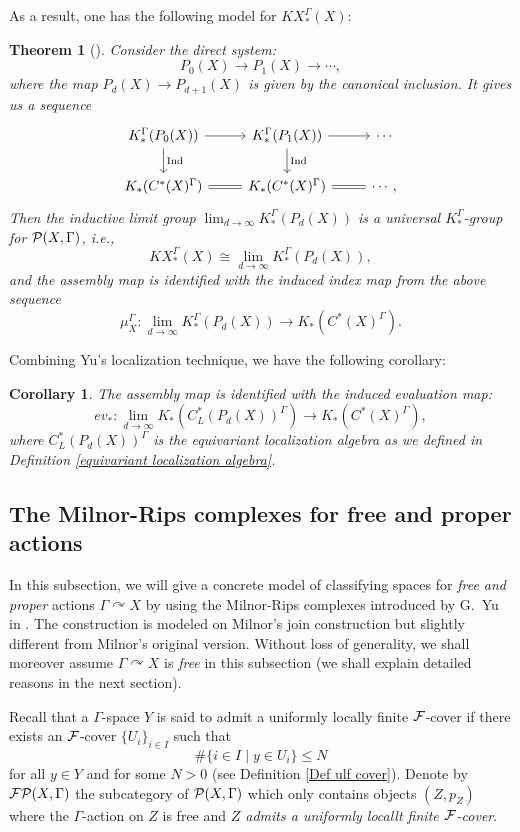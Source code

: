\documentclass[11pt]{article}
\theoremstyle{definition}
\theoremstyle{plain}
\newtheorem{Thm}[Def]{Theorem}
\newtheorem{Cor}[Def]{Corollary}
\def\ind{\textup{Ind}}
\def\Ga{\Gamma}
\def\car{\curvearrowright}
\begin{document}
As a result, one has the following model for $KX^{\Ga}_*(X)$:

\begin{Thm}[\cite{HIT2020}]
Consider the direct system:
$$P_0(X)\to P_1(X)\to \cdots,$$
where the map $P_d(X)\to P_{d+1}(X)$ is given by the canonical inclusion. It gives us a sequence
$$\begin{tikzcd}
K^{\Ga}_*(P_0(X)) \arrow[r, ] \arrow[d,  "\ind"] & K^{\Ga}_*(P_1(X)) \arrow[d, "\ind"] \arrow[r, ]& \cdots \\
K_*(C^*(X)^{\Ga}) \arrow[r, Rightarrow, no head]              & K_*(C^*(X)^{\Ga})\arrow[r, Rightarrow, no head]   & \cdots,
\end{tikzcd}$$
Then the inductive limit group $\lim_{d\to\infty}K^{\Ga}_*(P_d(X))$ is a universal $K^{\Ga}_*$-group for $\P(X,\Ga)$, i.e.,
$$KX^{\Ga}_*(X)\cong\lim_{d\to\infty}K^{\Ga}_*(P_d(X)),$$
and the assembly map is identified with the induced index map from the above sequence
$$\mu_X^{\Ga}:\lim_{d\to\infty}K^{\Ga}_*(P_d(X))\to K_*(C^*(X)^{\Ga}).$$ 
\end{Thm}

Combining Yu's localization technique, we have the following corollary:

\begin{Cor}
The assembly map is identified with the induced evaluation map:
$$ev_*:\lim_{d\to\infty}K_*(C^*_L(P_d(X))^{\Ga})\to K_*(C^*(X)^{\Ga}),$$
where $C^*_L(P_d(X))^{\Ga}$ is the equivariant localization algebra as we defined in Definition \ref{equivariant localization algebra}.
\end{Cor}

\subsection{The Milnor-Rips complexes for free and proper actions}\label{universal property for MR complexes}

In this subsection, we will give a concrete model of classifying spaces for \emph{free and proper} actions $\Ga\curvearrowright X$ by using the Milnor-Rips complexes introduced by G.~Yu in \cite{Yu1995}. The construction is modeled on Milnor's join construction \cite{Milnor56} but slightly different from Milnor's original version. Without loss of generality, we shall moreover assume $\Ga\car X$ is \emph{free} in this subsection (we shall explain detailed reasons in the next section).

Recall that a $\Ga$-space $Y$ is said to admit a uniformly locally finite $\mathcal F$-cover if there exists an $\mathcal F$-cover $\{U_i\}_{i\in I}$ such that
$$\#\{i\in I\mid y\in U_i\}\leq N$$
for all $y\in Y$ and for some $N>0$ (see Definition \ref{Def ulf cover}). Denote by $\F\P(X,\Ga)$ the subcategory of $\P(X,\Ga)$ which only contains objects $(Z,p_Z)$ where the $\Ga$-action on $Z$ is free and \emph{$Z$ admits a uniformly locallt finite $\mathcal F$-cover}. 
\end{document}
